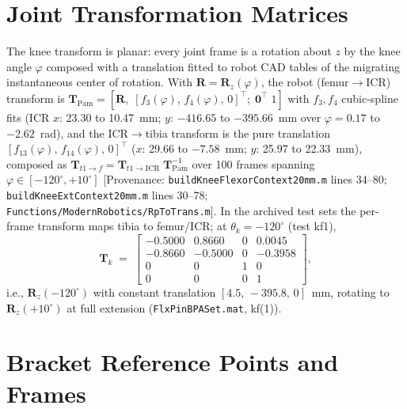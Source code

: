 \section{Joint Transformation Matrices}

The knee transform is planar: every joint frame is a rotation about $z$ by the knee angle $\varphi$ composed with a translation fitted to robot CAD tables of the migrating instantaneous center of rotation. With $\mathbf{R} = \mathbf{R}_{z}(\varphi)$, the robot (femur$\to$ICR) transform is $\mathbf{T}_{\text{Pam}} = [\mathbf{R},\; [f_{3}(\varphi),\,f_{4}(\varphi),\,0]^{\top};\; \mathbf{0}^{\top}\;1]$ with $f_{3}, f_{4}$ cubic-spline fits (ICR $x$: 23.30 to 10.47~mm; $y$: $-416.65$ to $-395.66$~mm over $\varphi = 0.17$ to $-2.62$~rad), and the ICR$\to$tibia transform is the pure translation $[f_{13}(\varphi),\,f_{14}(\varphi),\,0]^{\top}$ ($x$: 29.66 to $-7.58$~mm; $y$: 25.97 to 22.33~mm), composed as $\mathbf{T}_{t1\!\to\!f} = \mathbf{T}_{t1\!\to\!\text{ICR}}\;\mathbf{T}_{\text{Pam}}^{-1}$ over 100 frames spanning $\varphi \in [-120^{\circ}, +10^{\circ}]$ [Provenance: \texttt{buildKneeFlexorContext20mm.m} lines 34--80; \texttt{buildKneeExtContext20mm.m} lines 30--78; \texttt{Functions/ModernRobotics/RpToTrans.m}]. In the archived test sets the per-frame transform maps tibia to femur/ICR; at $\theta_{k}=-120^{\circ}$ (test kf1),
\begin{equation}
    \mathbf{T}_{k} \;=\;
    \begin{bmatrix}
    -0.5000 & 0.8660 & 0 & 0.0045\\
    -0.8660 & -0.5000 & 0 & -0.3958\\
    0 & 0 & 1 & 0\\
    0 & 0 & 0 & 1
    \end{bmatrix},
    \label{eq:app_Tk}
\end{equation}
i.e., $\mathbf{R}_{z}(-120^{\circ})$ with constant translation $[4.5,\,-395.8,\,0]$~mm, rotating to $\mathbf{R}_{z}(+10^{\circ})$ at full extension (\texttt{FlxPinBPASet.mat}, kf(1)).

\section{Bracket Reference Points and Frames}

